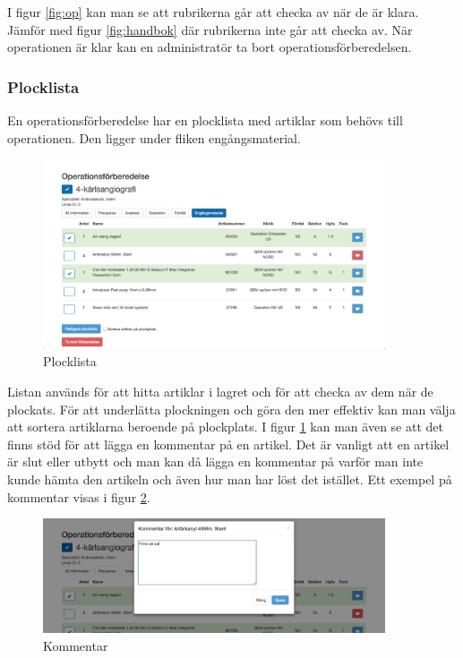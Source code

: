 I figur \ref{fig:op} kan man se att rubrikerna går att checka av när de är klara. Jämför med figur \ref{fig:handbok} där rubrikerna inte går att checka av. När operationen är klar kan en administratör ta bort operationsförberedelsen.
\subsubsection{Plocklista}
En operationsförberedelse har en plocklista med artiklar som behövs till operationen. Den ligger under fliken engångsmaterial.

\begin{figure}
  \centering
  \includegraphics[width=0.9\textwidth]{images/site/plocklista}
  \caption{Plocklista}
  \label{fig:plocklista}
\end{figure}

Listan används för att hitta artiklar i lagret och för att checka av dem när de plockats. För att underlätta plockningen och göra den mer effektiv kan man välja att sortera artiklarna beroende på plockplats.
I figur \ref{fig:plocklista} kan man även se att det finns stöd för att lägga en kommentar på en artikel.
Det är vanligt att en artikel är slut eller utbytt och man kan då lägga en kommentar på varför man inte kunde hämta den artikeln och även hur man har löst det istället. Ett exempel på kommentar visas i figur \ref{fig:kommentar}.

\begin{figure}
  \centering
  \includegraphics[width=0.9\textwidth]{images/site/kommentar}
  \caption{Kommentar}
  \label{fig:kommentar}
\end{figure}

